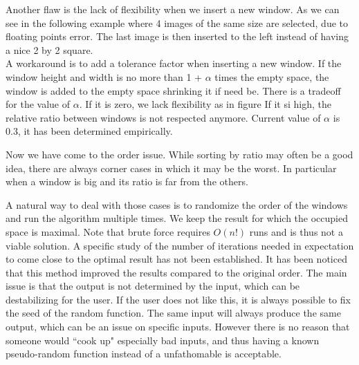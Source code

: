 \documentclass{acmtog}
\begin{document}
Another flaw is the lack of flexibility when we insert a new window. As we can see in the following example where 4 images of the same size are selected, due to floating points error. The last image is then inserted to the left instead of having a nice 2 by 2 square.  %
\\ 
A workaround is to add a tolerance factor when inserting a new window. If the window height and width is no more than 1 + $\alpha$ times the empty space, the window is added to the empty space shrinking it if need be. There is a tradeoff for the value of $\alpha$. If it is zero, we lack flexibility as in figure %
If it si high, the relative ratio between windows is not respected anymore. Current value of $\alpha$ is 0.3, it has been determined empirically. %

Now we have come to the order issue. While sorting by ratio may often be a good idea, there are always corner cases in which it may be the worst. In particular when a window is big and its ratio is far from the others.

A natural way to deal with those cases is to randomize the order of the windows and run the algorithm multiple times. We keep the result for which the occupied space is maximal. Note that brute force requires $O(n!)$ runs and is thus not a viable solution. A specific study of the number of iterations needed in expectation to come close to the optimal result has not been established. It has been noticed that this method improved the results compared to the original order. The main issue is that the output is not determined by the input, which can be destabilizing for the user. If the user does not like this, it is always possible to fix the seed of the random function. The same input will always produce the same output, which can be an issue on specific inputs. However there is no reason that someone would ``cook up" especially bad inputs, and thus having a known pseudo-random function instead of a unfathomable is acceptable.  



\begin{acks}
 
\end{acks}




 
\end{document}
